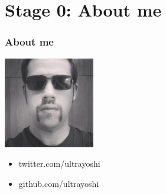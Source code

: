 \section{Stage 0: About me}

\begin{frame}
  \frametitle{About me}
  \includegraphics[width=150px]{images/bastard_david.jpg}
  \begin{itemize}
    \item twitter.com/ultrayoshi
    \item github.com/ultrayoshi
  \end{itemize}
\end{frame}
